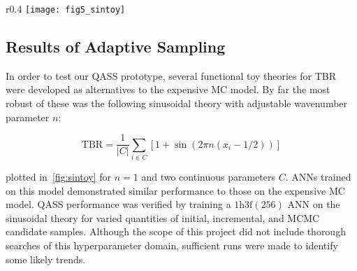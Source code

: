 \begin{wrapfigure}[10]{r}{0.4\textwidth}
	\centering
	\vspace{-16ex}
	\texttt{[image: fig5\_sintoy]}
	\caption{Sinusoidal toy TBR theory over two continuous parameters,
	$n=1$.}
	\label{fig:sintoy}
\end{wrapfigure}

\subsection{Results of Adaptive Sampling}
\label{sec:adaptiveres}
In order to test our QASS prototype, several functional toy theories for TBR were developed as alternatives to the expensive MC model. By far the most robust of these was the following sinusoidal theory with adjustable wavenumber parameter $n$:

\begin{equation}
	\text{TBR} = \frac{1}{|C|}\sum_{i \in C} \left[1 + \sin(2\pi n (x_i - 1/2)) \right]
\end{equation}

plotted in~\cref{fig:sintoy} for $n=1$ and two continuous parameters $C$.
ANNs trained on this model demonstrated similar performance to those on the expensive
MC model. QASS performance was verified by training a $\text{1h3f}(256)$ ANN on
the sinusoidal theory for varied quantities of initial, incremental, and MCMC
candidate samples. Although the scope of this project did not include thorough
searches of this hyperparameter domain, sufficient runs were made to identify
some likely trends.

